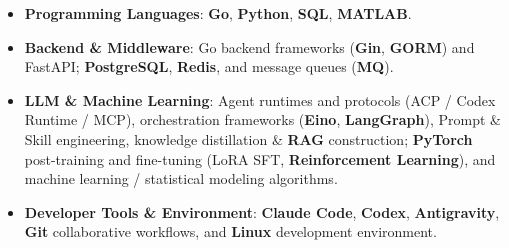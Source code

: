 \documentclass[10pt,letterpaper]{article}
\begin{document}
\begin{itemize}
  \item \textbf{Programming Languages}: \textbf{Go}, \textbf{Python}, \textbf{SQL}, \textbf{MATLAB}.
  \item \textbf{Backend \& Middleware}: Go backend frameworks (\textbf{Gin}, \textbf{GORM}) and FastAPI; \textbf{PostgreSQL}, \textbf{Redis}, and message queues (\textbf{MQ}).
  \item \textbf{LLM \& Machine Learning}: Agent runtimes and protocols (ACP / Codex Runtime / MCP), orchestration frameworks (\textbf{Eino}, \textbf{LangGraph}), Prompt \& Skill engineering, knowledge distillation \& \textbf{RAG} construction; \textbf{PyTorch} post-training and fine-tuning (LoRA SFT, \textbf{Reinforcement Learning}), and machine learning / statistical modeling algorithms.
  \item \textbf{Developer Tools \& Environment}: \textbf{Claude Code}, \textbf{Codex}, \textbf{Antigravity}, \textbf{Git} collaborative workflows, and \textbf{Linux} development environment.
\end{itemize}
\end{document}
